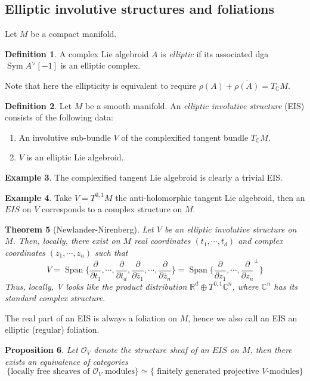 \documentclass[12pt]{amsart}
\newtheorem{thm}{Theorem}[section]
\newtheorem{prop}[thm]{Proposition}
\theoremstyle{definition}
\newtheorem{example}[thm]{Example}
\newtheorem{defn}[thm]{Definition}
\theoremstyle{remark}
\numberwithin{equation}{section}
\newcommand{\del}{\partial}
\renewcommand{\del}{\partial}
\newcommand{\CO}{{\mathcal O}}
\newcommand{\R}{{\mathbb{R}}}
\newcommand{\C}{{\mathbb{C}}}
\newcommand{\1}{{\mathbb{1}}}
\newcommand{\Span}{\operatorname{Span}}
\newcommand{\sym}{\operatorname{Sym}}
\begin{document}
\subsection{Elliptic involutive structures and foliations}
Let $M$ be a compact manifold.
\begin{defn}
    A complex Lie algebroid $A$ is {\it elliptic} if its associated dga $\sym A^{\vee}[-1]$ is an elliptic complex.
\end{defn}
Note that here the ellipticity is equivalent to require $\rho(A) + \overline{\rho(A)} = T_{\C} M$.
\begin{defn}
    Let $M$ be a smooth manifold. An {\it elliptic involutive structure} (EIS) consists of the following data:
    \begin{enumerate}
        \item An involutive sub-bundle $V$ of the complexified tangent bundle $T_{\C}M$.
        \item $V$ is an elliptic Lie algebroid.
    \end{enumerate}
\end{defn}
\begin{example}
    The complexified tangent Lie algebroid is clearly a trivial EIS.
\end{example}
\begin{example}
    Take $V = T^{0,1} M$ the anti-holomorphic tangent Lie algebroid, then an $EIS$ on $V$ corresponds to a complex structure on $M$.
 \end{example}
\begin{thm}[Newlander-Nirenberg]
    Let $V$ be an elliptic involutive structure on $M$. Then, locally, there exist on $M$ real coordinates $(t_1, \cdots, t_d)$ and complex coordinates $(z_1,\cdots, z_n)$ such that
\begin{equation}
    V = \Span \big\{\frac{\del}{\del t_1}, \cdots,\frac{\del}{\del t_d}, \frac{\del}{\del \overline{z}_1}, \cdots, \frac{\del}{\del \overline{z}_n}  \big\} = \Span \big\{\frac{\del}{\del z_1}, \cdots, \frac{\del}{\del z_n}^{\perp} \big\}
\end{equation}
Thus, locally, V looks like the product distribution $\R^d \oplus T^{0,1}\C^n$, where $\C^n$ has its
standard complex structure.
\end{thm}
The real part of an EIS is always a foliation on $M$, hence we also call an EIS an elliptic (regular) foliation. 

\begin{prop}
Let $\CO_V$ denote the structure sheaf of an $EIS$ on $M$, then there exists an equivalence of categories
\begin{equation}
    \{\text{locally free sheaves of $\CO_V$ modules}\} \simeq \{\text{ finitely generated projective $V$-modules} \}
\end{equation}
\end{prop}
 
\end{document}
